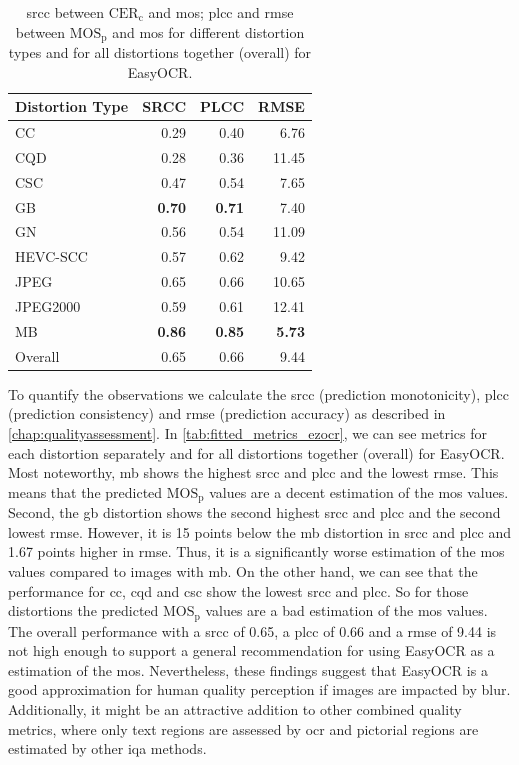 \begin{table}
    \centering
    \begin{tabular}{|l|rrr|}
        \hline
        Distortion Type & SRCC & PLCC & RMSE \\
        \hline
        \hline
        CC & 0.29 & 0.40 & 6.76 \\
        CQD & 0.28 & 0.36 & 11.45 \\
        CSC & 0.47 & 0.54 & 7.65 \\
        GB & \textbf{0.70} & \textbf{0.71} & 7.40 \\
        GN & 0.56 & 0.54 & 11.09 \\
        HEVC-SCC & 0.57 & 0.62 & 9.42 \\
        JPEG & 0.65 & 0.66 & 10.65 \\
        JPEG2000 & 0.59 & 0.61 & 12.41 \\
        MB & \textbf{0.86} & \textbf{0.85} & \textbf{5.73} \\
        \hline
        Overall & 0.65 & 0.66 & 9.44 \\
        \hline
    \end{tabular}
    \caption{\gls{srcc} between $\text{CER}_{\text{c}}$ and \gls{mos}; \gls{plcc} and \gls{rmse} between $\text{MOS}_{\text{p}}$ and \gls{mos} for different distortion types and for all distortions together (overall) for EasyOCR.}
    \label{tab:fitted_metrics_ezocr}
\end{table}
To quantify the observations we calculate the \gls{srcc} (prediction monotonicity), \gls{plcc} (prediction consistency) and \gls{rmse} (prediction accuracy) as described in \autoref{chap:qualityassessment}.
In \autoref{tab:fitted_metrics_ezocr}, we can see metrics for each distortion separately and for all distortions together (overall) for EasyOCR.
Most noteworthy, \gls{mb} shows the highest \gls{srcc} and \gls{plcc} and the lowest \gls{rmse}.
This means that the predicted $\text{MOS}_{\text{p}}$ values are a decent estimation of the \gls{mos} values.
Second, the \gls{gb} distortion shows the second highest \gls{srcc} and \gls{plcc} and the second lowest \gls{rmse}.
However, it is 15 points below the \gls{mb} distortion in \gls{srcc} and \gls{plcc} and 1.67 points higher in \gls{rmse}.
Thus, it is a significantly worse estimation of the \gls{mos} values compared to images with \gls{mb}.
On the other hand, we can see that the performance for \gls{cc}, \gls{cqd} and \gls{csc} show the lowest \gls{srcc} and \gls{plcc}.
So for those distortions the predicted $\text{MOS}_{\text{p}}$ values are a bad estimation of the \gls{mos} values.
The overall performance with a \gls{srcc} of 0.65, a \gls{plcc} of 0.66 and a \gls{rmse} of 9.44 is not high enough to support a general recommendation for using EasyOCR as a estimation of the \gls{mos}.
Nevertheless, these findings suggest that EasyOCR is a good approximation for human quality perception if images are impacted by blur.
Additionally, it might be an attractive addition to other combined quality metrics, where only text regions are assessed by \gls{ocr} and pictorial regions are estimated by other \gls{iqa} methods.

